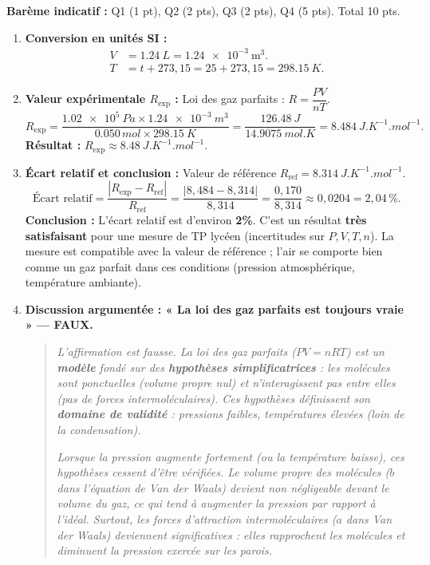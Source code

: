 \documentclass[11pt]{article}
\begin{document}
\begin{corrige}
\textbf{Barème indicatif :} Q1 (1 pt), Q2 (2 pts), Q3 (2 pts), Q4 (5 pts). Total 10 pts.
\begin{enumerate}
\item \textbf{Conversion en unités SI :}
      \begin{align*}
      V &= \SI{1,24}{L} = \SI{1,24e-3}{\cubic\meter}. \\
      T &= t + 273,15 = 25 + 273,15 = \SI{298,15}{K}.
      \end{align*}
\item \textbf{Valeur expérimentale $R_{\text{exp}}$ :}
      Loi des gaz parfaits : $R = \dfrac{P V}{n T}$.
      \[
      R_{\text{exp}} = \frac{\SI{1,02e5}{Pa} \times \SI{1,24e-3}{m^3}}{\num{0,050}\,mol \times \SI{298,15}{K}}
      = \frac{\SI{126,48}{J}}{\SI{14,9075}{mol.K}}
      = \SI{8,484}{J.K^{-1}.mol^{-1}}.
      \]
      \textbf{Résultat :} $\boxed{R_{\text{exp}} \approx \SI{8,48}{J.K^{-1}.mol^{-1}}}$.
\item \textbf{Écart relatif et conclusion :}
      Valeur de référence $R_{\text{ref}} = \SI{8,314}{J.K^{-1}.mol^{-1}}$.
      \[
      \text{Écart relatif} = \frac{|R_{\text{exp}} - R_{\text{ref}}|}{R_{\text{ref}}}
      = \frac{|8,484 - 8,314|}{8,314}
      = \frac{0,170}{8,314} \approx 0,0204 = \boxed{2,04\,\%}.
      \]
      \textbf{Conclusion :} L'écart relatif est d'environ \textbf{2\%}. C'est un résultat \textbf{très satisfaisant} pour une mesure de TP lycéen (incertitudes sur $P, V, T, n$). La mesure est compatible avec la valeur de référence ; l'air se comporte bien comme un gaz parfait dans ces conditions (pression atmosphérique, température ambiante).
\item \textbf{Discussion argumentée : « La loi des gaz parfaits est toujours vraie » — FAUX.}
      \begin{quote}
      \textit{L'affirmation est fausse. La loi des gaz parfaits ($PV=nRT$) est un \textbf{modèle} fondé sur des \textbf{hypothèses simplificatrices} : les molécules sont ponctuelles (volume propre nul) et n'interagissent pas entre elles (pas de forces intermoléculaires). Ces hypothèses définissent son \textbf{domaine de validité} : pressions faibles, températures élevées (loin de la condensation).}
      
      \textit{Lorsque la pression augmente fortement (ou la température baisse), ces hypothèses cessent d'être vérifiées. Le volume propre des molécules ($b$ dans l'équation de Van der Waals) devient non négligeable devant le volume du gaz, ce qui tend à augmenter la pression par rapport à l'idéal. Surtout, les forces d'attraction intermoléculaires ($a$ dans Van der Waals) deviennent significatives : elles rapprochent les molécules et diminuent la pression exercée sur les parois.}
      

\end{quote}
\end{enumerate}
\end{corrige}
\end{document}

